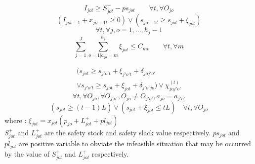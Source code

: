 \documentclass[letterpaper]{article} %
\begin{document}
\begin{equation}
I_{jot}\geq S_{jot}^{+} - ps_{jot} \quad\quad  \forall t, \forall O_{jo}
\end{equation}
\begin{equation}
(I_{j o t-1}+x_{j o+1 t} \geq 0) \vee  (s_{j o+1 t} \geq s_{jot}+\xi_{jot})
\end{equation}
$$\forall t, \forall j,o=1,...,h_{j}-1$$
\begin{equation}
\sum_{j=1}^{J} \sum_{o=1|a_{jo}=m}^{h_{j}} \xi_{j o t} \leq C_{mt}  \quad\quad  \forall t, \forall m
\end{equation}

\begin{multline}
\Big( s_{jot} \geq s_{j'o't} + \xi_{j'o't}+ \delta_{joj'o'} 
\\
\vee s_{j'o't}\geq s_{jot} + \xi_{jot}+ \delta_{j'o'jo} \Big)\vee\chi_{joj'o'}^{(t)}  
\end{multline}
$$\forall t, \forall O_{jo}, \forall O_{j'o'},
O_{jo}\neq O_{j'o'},a_{jo}=a_{j'o'}$$
\begin{equation}
(s_{jot} \geq (t-1)L) \vee  (s_{jot}+\xi_{jot} \leq tL) \quad  \forall t, \forall O_{jo}
\end{equation}
where : $\xi_{jot}=x_{jot}(p_{jo}+L_{jot}^{+}+pl_{jot})$
\\
$S_{jot}^{+}$ and $L_{jot}^{+}$ are the safety stock and safety slack value respectively. $ps_{jot}$ and $pl_{jot}$ are positive variable to obviate the infeasible situation that may be occurred by the value of $S_{jot}^{+}$ and $L_{jot}^{+}$ respectively.  
\end{document}
